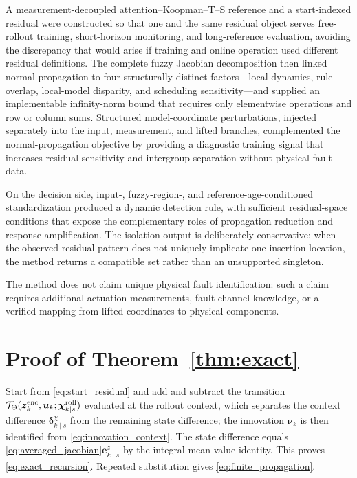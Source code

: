 \documentclass[journal]{IEEEtran}
\newcommand{\1}{\bm 1}
\begin{document}
A measurement-decoupled attention--Koopman--T--S reference and a start-indexed
residual were constructed so that one and the same residual object serves
free-rollout training, short-horizon monitoring, and long-reference
evaluation, avoiding the discrepancy that would arise if training and online
operation used different residual definitions. The complete fuzzy Jacobian
decomposition then linked normal propagation to four structurally distinct
factors---local dynamics, rule overlap, local-model disparity, and scheduling
sensitivity---and supplied an implementable infinity-norm bound that requires
only elementwise operations and row or column sums. Structured
model-coordinate perturbations, injected separately into the input,
measurement, and lifted branches, complemented the normal-propagation objective
by providing a diagnostic training signal that increases residual sensitivity
and intergroup separation without physical fault data.

On the decision side, input-, fuzzy-region-, and reference-age-conditioned
standardization produced a dynamic detection rule, with sufficient
residual-space conditions that expose the complementary roles of propagation
reduction and response amplification. The isolation output is deliberately
conservative: when the observed residual pattern does not uniquely implicate
one insertion location, the method returns a compatible set rather than an
unsupported singleton.

The method does not claim unique physical fault identification: such a claim
requires additional actuation measurements, fault-channel knowledge, or a
verified mapping from lifted coordinates to physical components.

\appendices
\section{Proof of Theorem~\ref{thm:exact}}
Start from \eqref{eq:start_residual} and add and subtract the transition
$\mathcal T_\Theta(\bm z_k^{\rm enc},\bm u_k;
\bm\chi_{k\mid s}^{\rm roll})$ evaluated at the rollout context, which
separates the context difference $\bm\delta_{k\mid s}^{\chi}$ from the
remaining state difference; the innovation $\bm\nu_k$ is then identified from
\eqref{eq:innovation_context}. The state difference equals
\eqref{eq:averaged_jacobian}$\bm e_{k\mid s}^z$ by the integral
mean-value identity. This proves \eqref{eq:exact_recursion}. Repeated
substitution gives \eqref{eq:finite_propagation}.
\end{document}
